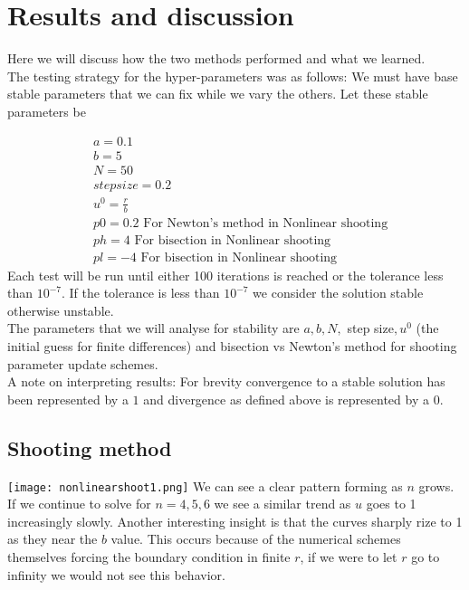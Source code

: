 \documentclass{article}
\begin{document}
\section{Results and discussion}
Here we will discuss how the two methods performed and what we learned. \\
The testing strategy for the hyper-parameters was as follows: We must have base stable parameters that we can fix while we vary the others. Let these stable parameters be

\begin{align*}
 & a = 0.1 \\
 & b = 5 \\
 & N = 50 \\
 & step size = 0.2 \\
 & u^0 = \frac{r}{b} \\
 & p0 = 0.2 \text{ \ \ \ For Newton's method in Nonlinear   shooting}\\
 & ph = 4 \text{ \ \ \ \ \ For bisection in Nonlinear shooting}\\
 & pl = -4 \text{ \ \ \ For bisection in Nonlinear shooting}
\end{align*}
Each test will be run until either 100 iterations is reached or the tolerance less than $10^{-7}$. If the tolerance is less than $10^{-7}$ we consider the solution stable otherwise unstable.  \\
The parameters that we will analyse for stability are $a,b,N,$ step size$,u^0$ (the initial guess for finite differences) and bisection vs Newton's method for shooting parameter update schemes. \\
A note on interpreting results: For brevity convergence to a stable solution has been represented by a $1$ and divergence as defined above is represented by a $0$.  
\subsection{Shooting method}
\texttt{[image: nonlinearshoot1.png]}
We can see a clear pattern forming as $n$ grows. If we continue to solve for $n=4,5,6$ we see a similar trend as $u$ goes to 1 increasingly slowly. Another interesting insight is that the curves sharply rize to 1 as they near the $b$ value. This occurs because of the numerical schemes themselves forcing the boundary condition in finite $r$, if we were to let $r$ go to infinity we would not see this behavior. \\
\end{document}
